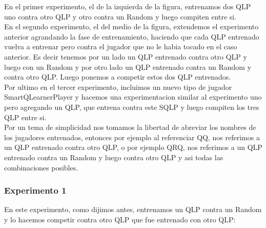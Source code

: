 \documentclass[10pt, a4paper]{article}
\begin{document}
En el primer experimento, el de la izquierda de la figura, entrenamos dos QLP uno contra otro QLP y otro contra un Random y luego compiten entre si.\\

En el segundo experimento, el del medio de la figura, extendemos el experimento anterior agrandando la fase de entrenamiento, haciendo que cada QLP entrenado vuelva a entrenar pero contra el jugador que no le habia tocado en el caso anterior. Es decir tenemos por un lado un QLP entrenado contra otro QLP y luego con un Random y por otro lado un QLP entrenado contra un Random y contra otro QLP. Luego ponemos a competir estos dos QLP entrenados.\\

Por ultimo en el tercer experimento, incluimos un nuevo tipo de jugador SmartQLearnerPlayer y hacemos una experimentacion similar al experimento uno pero agregando un QLP, que entrena contra este SQLP y luego compiten los tres QLP entre si.\\

Por un tema de simplicidad nos tomamos la libertad de abreviar los nombres de los jugadores entrenados, entonces por ejemplo al referenciar QQ, nos referimos a un QLP entrenado contra otro QLP, o por ejemplo QRQ, nos referimos a un QLP entrenado contra un Random y luego contra otro QLP y asi todas las combinaciones posibles.


\subsubsection{Experimento 1}


En este experimento, como dijimos antes, entrenamos un QLP contra un Random y lo hacemos competir contra otro QLP que fue entrenado con otro QLP:
\end{document}
